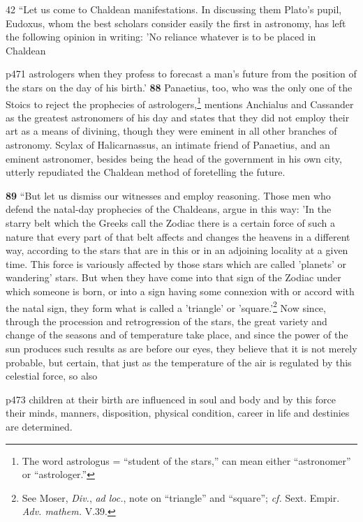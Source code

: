 42
``Let us come to Chaldean manifestations. In discussing them Plato's pupil, Eudoxus, whom the best scholars consider easily the first in astronomy, has left the following opinion in writing: 'No reliance whatever is to be placed in Chaldean

p471 astrologers when they profess to forecast a man's future from the position of the stars on the day of his birth.' \textbf{88} Panaetius, too, who was the only one of the Stoics to reject the prophecies of astrologers,\texthebrew{}\footnote{The word astrologus = ``student of the stars,'' can mean either ``astronomer'' or ``astrologer.''

} mentions Anchialus and Cassander as the greatest astronomers of his day and states that they did not employ their art as a means of divining, though they were eminent in all other branches of astronomy. Scylax of Halicarnassus, an intimate friend of Panaetius, and an eminent astronomer, besides being the head of the government in his own city, utterly repudiated the Chaldean method of foretelling the future.

\textbf{89} ``But let us dismiss our witnesses and employ reasoning. Those men who defend the natal-day prophecies of the Chaldeans, argue in this way: 'In the starry belt which the Greeks call the Zodiac there is a certain force of such a nature that every part of that belt affects and changes the heavens in a different way, according to the stars that are in this or in an adjoining locality at a given time. This force is variously affected by those stars which are called 'planets' or wandering' stars. But when they have come into that sign of the Zodiac under which someone is born, or into a sign having some connexion with or accord with the natal sign, they form what is called a 'triangle' or 'square.'\texthebrew{}\footnote{See Moser, \emph{Div.}, \emph{ad loc.}, note on ``triangle'' and ``square''; \emph{cf.} Sext. Empir. \emph{Adv. mathem.} V.39.

} Now since, through the procession and retrogression of the stars, the great variety and change of the seasons and of temperature take place, and since the power of the sun produces such results as are before our eyes, they believe that it is not merely probable, but certain, that just as the temperature of the air is regulated by this celestial force, so also

p473 children at their birth are influenced in soul and body and by this force their minds, manners, disposition, physical condition, career in life and destinies are determined.

